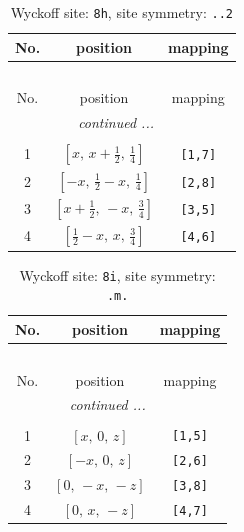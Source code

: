 \documentclass[fleqn,8pt]{jsarticle}
\begin{document}
\begin{longtable}{ccc}
\caption{Wyckoff site: {\tt 8h}, site symmetry: {\tt ..2}}
 \\
 \hline \hline
No. & position & mapping \\ \hline \endfirsthead

\multicolumn{2}{l}{\tablename\ \thetable{}} \\
 \hline \hline
No. & position & mapping \\ \hline \endhead

 \hline \hline
\multicolumn{2}{r}{\footnotesize\it continued ...} \\ \endfoot

 \hline \hline
\multicolumn{2}{r}{} \\ \endlastfoot

1 & $\left[ x,\, x + \frac{1}{2},\, \frac{1}{4} \right]$ & {\tt [1,7]} \\ \hline
2 & $\left[ - x,\, \frac{1}{2} - x,\, \frac{1}{4} \right]$ & {\tt [2,8]} \\ \hline
3 & $\left[ x + \frac{1}{2},\, - x,\, \frac{3}{4} \right]$ & {\tt [3,5]} \\ \hline
4 & $\left[ \frac{1}{2} - x,\, x,\, \frac{3}{4} \right]$ & {\tt [4,6]} \\
\end{longtable}
\renewcommand{\arraystretch}{1.2}
\begin{longtable}{ccc}
\caption{Wyckoff site: {\tt 8i}, site symmetry: {\tt .m.}}
 \\
 \hline \hline
No. & position & mapping \\ \hline \endfirsthead

\multicolumn{2}{l}{\tablename\ \thetable{}} \\
 \hline \hline
No. & position & mapping \\ \hline \endhead

 \hline \hline
\multicolumn{2}{r}{\footnotesize\it continued ...} \\ \endfoot

 \hline \hline
\multicolumn{2}{r}{} \\ \endlastfoot

1 & $\left[ x,\, 0,\, z \right]$ & {\tt [1,5]} \\ \hline
2 & $\left[ - x,\, 0,\, z \right]$ & {\tt [2,6]} \\ \hline
3 & $\left[ 0,\, - x,\, - z \right]$ & {\tt [3,8]} \\ \hline
4 & $\left[ 0,\, x,\, - z \right]$ & {\tt [4,7]} \\
\end{longtable}
\end{document}
